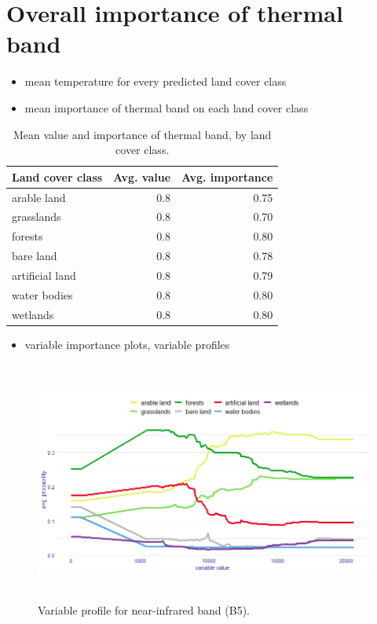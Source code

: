 \documentclass{amuthesis}
\begin{document}
\hypertarget{sec-imp-overall}{%
\section{Overall importance of thermal band}\label{sec-imp-overall}}

\begin{itemize}
\item
  mean temperature for every predicted land cover class
\item
  mean importance of thermal band on each land cover class
\end{itemize}

\hypertarget{tbl-tabela6}{}
\begin{table}
\caption{\label{tbl-tabela6}Mean value and importance of thermal band, by land cover class. }\tabularnewline

\centering
\begin{tabular}{|>{}l|>{}r|>{}r|}
\toprule
\textbf{Land cover class} & \textbf{Avg. value} & \textbf{Avg. importance}\\
\midrule
arable land & 0.8 & 0.75\\
\hline
grasslands & 0.8 & 0.70\\
\hline
forests & 0.8 & 0.80\\
\hline
bare land & 0.8 & 0.78\\
\hline
artificial land & 0.8 & 0.79\\
\hline
water bodies & 0.8 & 0.80\\
\hline
wetlands & 0.8 & 0.80\\
\bottomrule
\end{tabular}
\end{table}

\begin{itemize}
\tightlist
\item
  variable importance plots, variable profiles
\end{itemize}

\begin{figure}[t]

{\centering \includegraphics[width=5.90625in,height=3.125in]{./figures/profB5.png}

}

\caption{\label{fig-rycina12}Variable profile for near-infrared band
(B5).}

\end{figure}
\end{document}

